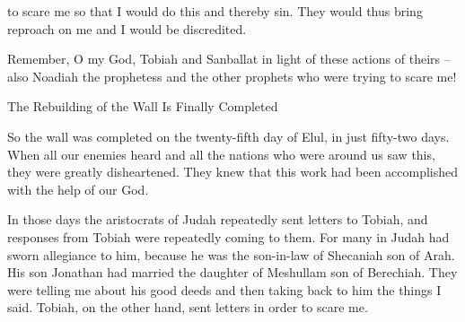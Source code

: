 {to scare me
so that
I would
do
this
and thereby
sin.
They
would thus
bring
reproach on me and I would be
discredited.
\par }{\PP {}Remember,
O my God,
Tobiah
and Sanballat
in light of these
actions of theirs – also Noadiah the prophetess and the other prophets who were trying to scare me!
\par }{\SH The Rebuilding of the Wall Is Finally Completed
\par }{\PP {}So the wall
was completed
on the twenty-fifth
day of Elul,
in just fifty-two
days.
When
all
our enemies
heard
and all
the nations
who
were around
us saw
this, they were
greatly
disheartened.
They knew
that
this
work
had been accomplished
with
the help of our God.
\par }{\PP {}In those
days
the aristocrats
of Judah
repeatedly sent letters
to
Tobiah,
and responses
from Tobiah
were repeatedly coming
to them.
For
many
in Judah
had sworn
allegiance to him, because
he
was the son-in-law
of Shecaniah
son
of Arah.
His son
Jonathan
had married
the daughter
of Meshullam
son
of Berechiah.
They were
telling
me about his good
deeds and then taking back to him the things
I said.
Tobiah,
on the other hand, sent
letters
in order to scare me.

}
